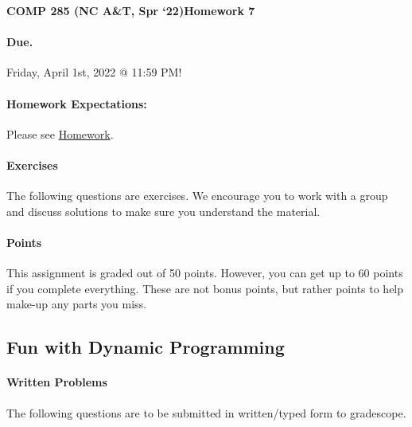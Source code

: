 \documentclass [12pt]{article}
\begin{document}
 

{\LARGE \textbf {COMP 285 (NC A\&T, Spr `22)}\hfill \textbf {Homework 7} } 
\vspace {1em} 
\begin{Instruction} 

\paragraph {Due.} Friday, April 1st, 2022 @ 11:59 PM!
\end{Instruction} 

\vspace {1em} 
\begin{Instruction} \paragraph {Homework Expectations:} Please see \href{https://www.comp285.ml/homework/#general-homework-information}{Homework}.
\end{Instruction}

\vspace {1em} 
\begin{Instruction} 

\paragraph {Exercises} The following questions are exercises. We encourage you to work with a group and discuss solutions to make sure you understand the material.

\paragraph {Points} This assignment is graded out of 50 points. However, you can get up to 60 points if you complete everything. These are not bonus points, but rather points to help make-up any parts you miss.

\end{Instruction} 

\begin{centering}
\section*{Fun with Dynamic Programming}
\end{centering}

\begin{Instruction}

\paragraph{Written Problems} The following questions are to be submitted in written/typed form to gradescope.

\end{Instruction}
\end{document}
